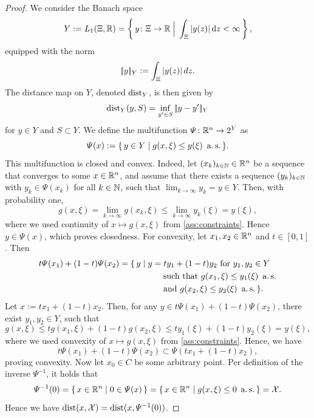 \begin{proof}
    We consider the Banach space
    \[
        Y := L_1(\Xi, \mathbb{R}) = \left\{\, y\colon\Xi\to\mathbb{R} \;\Big|\; \int_{\Xi} | y(z) | \, \textnormal{d}z < \infty \,\right\},
    \]
    equipped with the norm
    \[
        |\!|y|\!|_{Y} := \int_{\Xi} | y(z) | \, dz.
    \]
    The distance map on $Y$, denoted $\operatorname{dist}_Y$, is then given by
    \[
        \operatorname{dist}_Y(y, S) = \inf_{y^\prime\in S} |\!|y - y^\prime|\!|_Y
    \]
    for $y\in Y$ and $S\subset Y$.
    We define the multifunction $\varPsi\colon \mathbb{R}^n \to 2^{Y}$ as
    \[
        \varPsi(x) := \{\, y\in Y \mid g(x, \xi) \leq y(\xi) \text{ \,a.\,s.} \,\}.
    \]
    This multifunction is closed and convex. Indeed, let $(x_k)_{k\in\mathbb{N}} \in \mathbb{R}^n$
    be a sequence that converges to some $x\in\mathbb{R}^n$, and assume that there exists
    a sequence $(y_k)_{k\in\mathbb{N}}$ with $y_k\in\varPsi(x_k)$ for all $k\in\mathbb{N}$, such that
    $\lim_{k\to\infty} y_k = y \in Y$.
    Then, with probability one,
    \[
        g(x, \xi) = \lim_{k\to\infty} g(x_k, \xi) \leq \lim_{k\to\infty} y_k(\xi) = y(\xi),
    \]
    where we used continuity of $x\mapsto g(x, \xi)$ from \cref{ass:constraints}.
    Hence $y\in\varPsi(x)$, which proves closedness.
    For convexity, let
    $x_1, x_2 \in \mathbb{R}^n$ and $t\in [0, 1]$. Then
    \begin{align*}
        t\varPsi(x_1) + (1-t)\varPsi(x_2)
        = \{\, y &\mid y = ty_1 + (1-t)y_2 \text{ for } y_1, y_2\in Y \\
                &\phantom{===} \text{ such that } g(x_1, \xi) \leq y_1(\xi) \text{ \,a.\,s.} \\
                &\phantom{===} \text{ and } g(x_2, \xi) \leq y_2(\xi) \text{ \,a.\,s.} \,\}.
    \end{align*}
    Let $x := t x_1 + (1-t) x_2$. Then, for any $y \in t\varPsi(x_1) + (1-t)\varPsi(x_2)$, there exist
    $y_1, y_2\in Y$, such that
    \[
        g(x, \xi) \leq t g(x_1, \xi) + (1-t) g(x_2, \xi) \leq t y_1(\xi) + (1-t)y_2(\xi) = y(\xi),
    \]
    where we used convexity of $x\mapsto g(x, \xi)$ from \cref{ass:constraints}.
    Hence, we have
    \[
        t\varPsi(x_1) + (1-t)\varPsi(x_2) \subset \varPsi(t x_1 + (1-t) x_2),
    \]
    proving convexity.
    Now let $x_0\in C$ be some arbitrary point.
    Per definition of the inverse $\varPsi^{-1}$, it holds that
    \[
        \varPsi^{-1}(0) = \{\, x\in\mathbb{R}^n \mid 0 \in \varPsi(x) \,\} = \{\, x\in\mathbb{R}^n \mid g(x,\xi) \leq 0 \text{ \,a.\,s.} \,\}
        =
        \mathcal{X}.
    \]
    Hence we have $\operatorname{dist}(x, \mathcal{X}) = \operatorname{dist}(x, \varPsi^{-1}(0))$.

\end{proof}
